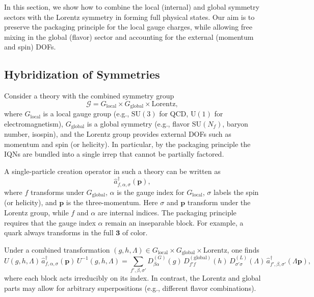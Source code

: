 \documentclass[12pt,a4paper]{article}
\begin{document}
In this section, we show how to combine the local (internal) and global symmetry sectors with the Lorentz symmetry in forming full physical states.
Our aim is to preserve the packaging principle for the local gauge charges, while allowing free mixing in the global (flavor) sector and accounting for the external (momentum and spin) DOFs.



\subsection{Hybridization of Symmetries}


Consider a theory with the combined symmetry group \cite{ColemanMandula1967,HLS1975}
\[
\mathcal{G}
=
G_{\mathrm{local}}
\times
G_{\mathrm{global}}
\times
\mathrm{Lorentz},
\]
where $G_{\mathrm{local}}$ is a local gauge group (e.g., $\mathrm{SU}(3)$ for QCD, $\mathrm{U}(1)$ for electromagnetism), $G_{\mathrm{global}}$ is a global symmetry (e.g., flavor SU$(N_f)$, baryon number, isospin), and the Lorentz group provides external DOFs such as momentum and spin (or helicity).
In particular, by the packaging principle the IQNs are bundled into a single irrep that cannot be partially factored.


A single-particle creation operator in such a theory can be written as
\[
\hat{a}^\dagger_{f,\alpha,\sigma}(\mathbf{p}),
\]
where $f$ transforms under $G_{\mathrm{global}}$, $\alpha$ is the gauge index for $G_{\mathrm{local}}$, $\sigma$ labels the spin (or helicity), and $\mathbf{p}$ is the three-momentum.  Here $\sigma$ and $\mathbf{p}$ transform under the Lorentz group, while $f$ and $\alpha$ are internal indices.
The packaging principle requires that the gauge index $\alpha$ remain an inseparable block.
For example, a quark always transforms in the full $\mathbf3$ of color.


Under a combined transformation $(g,h,\Lambda)\in G_{\mathrm{local}}\times G_{\mathrm{global}}\times\mathrm{Lorentz}$, one finds
\[
U(g,h,\Lambda)\,\hat a^\dagger_{f,\alpha,\sigma}(\mathbf p)\,U^{-1}(g,h,\Lambda)
=
\sum_{f',\beta,\sigma'}
D^{(G)}_{\beta\alpha}(g)\,
D^{(\mathrm{global})}_{f'f}(h)\,
D^{(L)}_{\sigma'\sigma}(\Lambda)\,
\hat a^\dagger_{f',\beta,\sigma'}(\Lambda\mathbf p),
\]
where each block acts irreducibly on its index.
In contrast, the Lorentz and global parts may allow for arbitrary superpositions (e.g., different flavor combinations).
\end{document}
